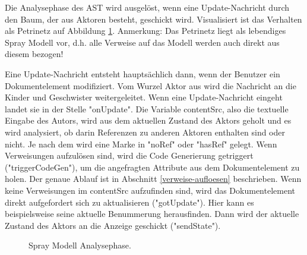 Die Analysephase des AST wird ausgelöst, wenn eine Update-Nachricht durch den Baum, der aus Aktoren besteht, geschickt wird. Visualisiert ist das Verhalten als Petrinetz auf Abbildung \ref{Analysephase}. Anmerkung: Das Petrinetz liegt als lebendiges Spray Modell vor, d.h. alle Verweise auf das Modell werden auch direkt aus diesem bezogen!

 
Eine Update-Nachricht entsteht hauptsächlich dann, wenn der Benutzer ein Dokumentelement modifiziert. Vom Wurzel Aktor aus wird die Nachricht an die Kinder und Geschwister weitergeleitet. Wenn eine Update-Nachricht eingeht landet sie in der Stelle "onUpdate". Die Variable contentSrc, also die textuelle Eingabe des Autors, wird aus dem aktuellen Zustand des Aktors geholt und es wird analysiert, ob darin Referenzen zu anderen Aktoren enthalten sind oder nicht. Je nach dem wird eine Marke in "noRef" oder "hasRef" gelegt. Wenn Verweisungen aufzulösen sind, wird die Code Generierung getriggert ("triggerCodeGen"), um die angefragten Attribute aus dem Dokumentelement zu holen. Der genaue Ablauf ist in Abschnitt \ref{verweise-aufloesen} beschrieben. Wenn keine Verweisungen im contentSrc aufzufinden sind, wird das Dokumentelement direkt aufgefordert sich zu aktualisieren ("gotUpdate"). Hier kann es beispielsweise seine aktuelle Benummerung herausfinden. Dann wird der aktuelle Zustand des Aktors an die Anzeige geschickt ("sendState").

 
\begin{figure}[h!]
\centering
\advance\leftskip-2.5cm
\caption{ Spray Modell Analysephase. }\label{Analysephase}
\end{figure}
 
